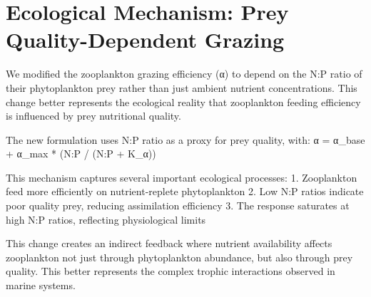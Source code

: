 \section{Ecological Mechanism: Prey Quality-Dependent Grazing}

We modified the zooplankton grazing efficiency (α) to depend on the N:P ratio of their phytoplankton prey rather than just ambient nutrient concentrations. This change better represents the ecological reality that zooplankton feeding efficiency is influenced by prey nutritional quality.

The new formulation uses N:P ratio as a proxy for prey quality, with:
α = α_base + α_max * (N:P / (N:P + K_α))

This mechanism captures several important ecological processes:
1. Zooplankton feed more efficiently on nutrient-replete phytoplankton
2. Low N:P ratios indicate poor quality prey, reducing assimilation efficiency
3. The response saturates at high N:P ratios, reflecting physiological limits

This change creates an indirect feedback where nutrient availability affects zooplankton not just through phytoplankton abundance, but also through prey quality. This better represents the complex trophic interactions observed in marine systems.

